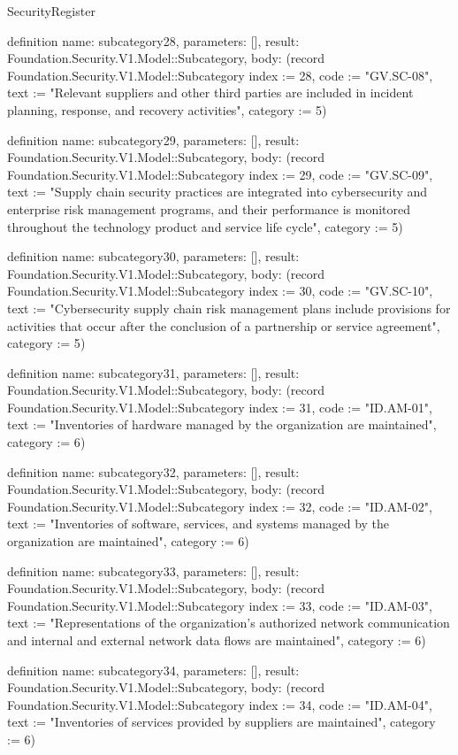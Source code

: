 \begin{lexlean}{SecurityRegister}
\begin{semanticmodule}
definition{
  name: subcategory28,
  parameters: [],
  result: Foundation.Security.V1.Model::Subcategory,
  body: (record Foundation.Security.V1.Model::Subcategory {index := 28, code := "GV.SC-08", text := "Relevant suppliers and other third parties are included in incident planning, response, and recovery activities", category := 5})
}

definition{
  name: subcategory29,
  parameters: [],
  result: Foundation.Security.V1.Model::Subcategory,
  body: (record Foundation.Security.V1.Model::Subcategory {index := 29, code := "GV.SC-09", text := "Supply chain security practices are integrated into cybersecurity and enterprise risk management programs, and their performance is monitored throughout the technology product and service life cycle", category := 5})
}

definition{
  name: subcategory30,
  parameters: [],
  result: Foundation.Security.V1.Model::Subcategory,
  body: (record Foundation.Security.V1.Model::Subcategory {index := 30, code := "GV.SC-10", text := "Cybersecurity supply chain risk management plans include provisions for activities that occur after the conclusion of a partnership or service agreement", category := 5})
}

definition{
  name: subcategory31,
  parameters: [],
  result: Foundation.Security.V1.Model::Subcategory,
  body: (record Foundation.Security.V1.Model::Subcategory {index := 31, code := "ID.AM-01", text := "Inventories of hardware managed by the organization are maintained", category := 6})
}

definition{
  name: subcategory32,
  parameters: [],
  result: Foundation.Security.V1.Model::Subcategory,
  body: (record Foundation.Security.V1.Model::Subcategory {index := 32, code := "ID.AM-02", text := "Inventories of software, services, and systems managed by the organization are maintained", category := 6})
}

definition{
  name: subcategory33,
  parameters: [],
  result: Foundation.Security.V1.Model::Subcategory,
  body: (record Foundation.Security.V1.Model::Subcategory {index := 33, code := "ID.AM-03", text := "Representations of the organization's authorized network communication and internal and external network data flows are maintained", category := 6})
}

definition{
  name: subcategory34,
  parameters: [],
  result: Foundation.Security.V1.Model::Subcategory,
  body: (record Foundation.Security.V1.Model::Subcategory {index := 34, code := "ID.AM-04", text := "Inventories of services provided by suppliers are maintained", category := 6})
}


\end{semanticmodule}
\end{lexlean}
